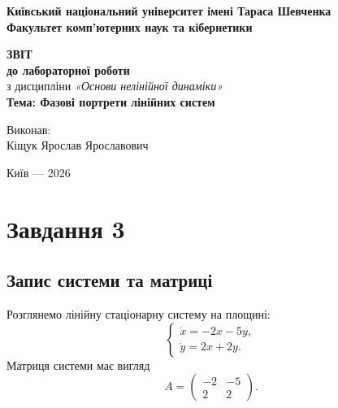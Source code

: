 \documentclass[12pt,a4paper]{article}
\begin{document}
\begin{titlepage}
    \begin{center}
        \textbf{Київський національний університет імені Тараса Шевченка}\\
        \textbf{Факультет комп'ютерних наук та кібернетики}
    \end{center}

    \vspace{4cm}

    \begin{center}
        \textbf{\Large ЗВІТ}\\
        \vspace{0.5cm}
        \textbf{\large до лабораторної роботи}\\
        \vspace{0.5cm}
        з дисципліни \textit{«Основи нелінійної динаміки»}\\
        \vspace{0.7cm}
        \textbf{Тема: Фазові портрети лінійних систем}
    \end{center}

    \vfill

    \begin{flushright}
        Виконав:\\
        Кіщук Ярослав Ярославович
    \end{flushright}

    \vspace{1.5cm}

    \begin{center}
        Київ --- 2026
    \end{center}
\end{titlepage}

\tableofcontents
\newpage

\section{Завдання 3}

\subsection{Запис системи та матриці}

Розглянемо лінійну стаціонарну систему на площині:
\[
\begin{cases}
\dot{x} = -2x - 5y, \\
\dot{y} = 2x + 2y.
\end{cases}
\]
Матриця системи має вигляд
\[
A =
\begin{pmatrix}
-2 & -5 \\
2 & 2
\end{pmatrix}.
\]
\end{document}
